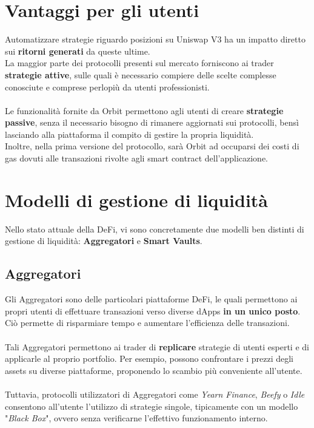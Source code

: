 \documentclass[12pt,a4paper]{report}
\begin{document}
\section{Vantaggi per gli utenti}

Automatizzare strategie riguardo posizioni su Uniswap V3 ha un impatto diretto sui \textbf{ritorni generati} da queste ultime.
\\La maggior parte dei protocolli presenti sul mercato forniscono ai trader \textbf{strategie attive}, sulle quali è necessario compiere delle scelte complesse conosciute e comprese perlopiù da utenti professionisti.
\\\\Le funzionalità fornite da Orbit permettono agli utenti di creare \textbf{strategie passive}, senza il necessario bisogno di rimanere aggiornati sui protocolli, bensì lasciando alla piattaforma il compito di gestire la propria liquidità.
\\Inoltre, nella prima versione del protocollo, sarà Orbit ad occuparsi dei costi di gas dovuti alle transazioni rivolte agli smart contract dell'applicazione.

\section{Modelli di gestione di liquidità}

Nello stato attuale della DeFi, vi sono concretamente due modelli ben distinti di gestione di liquidità:  \textbf{Aggregatori}\cite{aggregator} e  \textbf{Smart Vaults}\cite{smart_vault}.

\subsection{Aggregatori}

Gli Aggregatori sono delle particolari piattaforme DeFi, le quali permettono ai propri utenti di effettuare transazioni verso diverse dApps \textbf{in un unico posto}. Ciò permette di risparmiare tempo e aumentare l'efficienza delle transazioni.
\\\\Tali Aggregatori permettono ai trader di \textbf{replicare} strategie di utenti esperti e di applicarle al proprio portfolio. Per esempio, possono confrontare i prezzi degli assets su diverse piattaforme, proponendo lo scambio più conveniente all'utente.
\\\\Tuttavia, protocolli utilizzatori di Aggregatori come \textit{Yearn Finance}\cite{yearn}, \textit{Beefy}\cite{beefy} o \textit{Idle}\cite{idle} consentono all'utente l'utilizzo di strategie singole, tipicamente con un modello "\textit{Black Box}", ovvero senza verificarne l'effettivo funzionamento interno.
\end{document}
